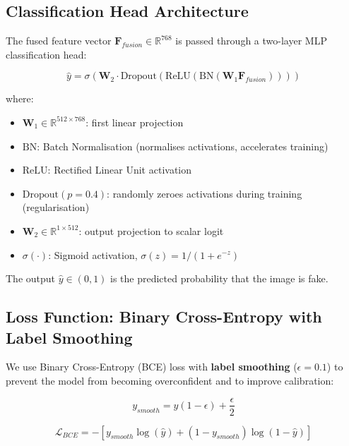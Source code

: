 \documentclass[12pt,a4paper]{article}
\begin{document}
\subsection{Classification Head Architecture}

The fused feature vector $\mathbf{F}_{fusion} \in \mathbb{R}^{768}$ is passed through a
two-layer MLP classification head:

\begin{equation}
  \hat{y} = \sigma\!\left(\mathbf{W}_2 \cdot \text{Dropout}\!\left(
    \text{ReLU}\!\left(\text{BN}(\mathbf{W}_1 \mathbf{F}_{fusion})\right)
  \right)\right)
\end{equation}

where:
\begin{itemize}[leftmargin=1.5em]
  \item $\mathbf{W}_1 \in \mathbb{R}^{512 \times 768}$: first linear projection
  \item $\text{BN}$: Batch Normalisation (normalises activations, accelerates training)
  \item $\text{ReLU}$: Rectified Linear Unit activation
  \item $\text{Dropout}(p=0.4)$: randomly zeroes activations during training (regularisation)
  \item $\mathbf{W}_2 \in \mathbb{R}^{1 \times 512}$: output projection to scalar logit
  \item $\sigma(\cdot)$: Sigmoid activation, $\sigma(z) = 1/(1 + e^{-z})$
\end{itemize}

The output $\hat{y} \in (0, 1)$ is the predicted probability that the image is fake.

\subsection{Loss Function: Binary Cross-Entropy with Label Smoothing}

We use Binary Cross-Entropy (BCE) loss with \textbf{label smoothing} ($\epsilon = 0.1$)
to prevent the model from becoming overconfident and to improve calibration:

\begin{equation}
  y_{smooth} = y(1 - \epsilon) + \frac{\epsilon}{2}
\end{equation}

\begin{equation}
  \mathcal{L}_{BCE} = -\left[
    y_{smooth} \log(\hat{y}) + (1 - y_{smooth}) \log(1 - \hat{y})
  \right]
\end{equation}
\end{document}
